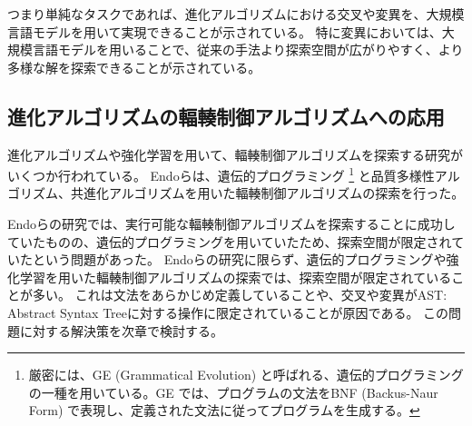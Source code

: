 \documentclass[a4paper,11pt]{jreport}
\begin{document}
つまり単純なタスクであれば、進化アルゴリズムにおける交叉や変異を、大規模言語モデルを用いて実現できることが示されている。
特に変異においては、大規模言語モデルを用いることで、従来の手法より探索空間が広がりやすく、より多様な解を探索できることが示されている。

\subsection{進化アルゴリズムの輻輳制御アルゴリズムへの応用}

進化アルゴリズムや強化学習を用いて、輻輳制御アルゴリズムを探索する研究がいくつか行われている。
Endoら\cite{endo-2022-toward}は、遺伝的プログラミング\cite{holland1992adaptation, gp, gp-foundation}
\footnote{厳密には、GE (Grammatical Evolution) \cite{grammatical-evolution}と呼ばれる、遺伝的プログラミングの一種を用いている。GE では、プログラムの文法をBNF (Backus-Naur Form) で表現し、定義された文法に従ってプログラムを生成する。}
と品質多様性アルゴリズム\cite{quality-diversity}、共進化アルゴリズム\cite{poet, poet-gecco}を用いた輻輳制御アルゴリズムの探索を行った。

Endoらの研究では、実行可能な輻輳制御アルゴリズムを探索することに成功していたものの、遺伝的プログラミングを用いていたため、探索空間が限定されていたという問題があった。
Endoらの研究に限らず、遺伝的プログラミングや強化学習を用いた輻輳制御アルゴリズムの探索では、探索空間が限定されていることが多い。
これは文法をあらかじめ定義していることや、交叉や変異がAST: Abstract Syntax Treeに対する操作に限定されていることが原因である。
この問題に対する解決策を次章で検討する。

\newpage
\end{document}
